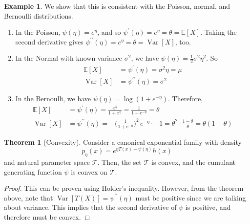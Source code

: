 \documentclass{article}
\DeclareMathOperator{\Var}{Var}
\theoremstyle{definition}
\newtheorem{theorem}{Theorem}[section]
\newtheorem{example}{Example}[section]
\begin{document}
  \begin{example}
  We show that this is consistent with the Poisson, normal, and Bernoulli distributions. 
  \begin{enumerate}
      \item In the Poisson, $\psi(\eta) = e^{\eta}$, and so $\psi^\prime(\eta) = e^\eta = \theta = \mathbb{E}[X]$. Taking the second derivative gives $\psi^{\prime\prime}(\eta) = e^\eta = \theta = \Var[X]$, too. \
      
      \item In the Normal with known variance $\sigma^2$, we have $\psi(\eta) = \frac{1}{2} \sigma^2 \eta^2$. So 
      \begin{align*}
          \mathbb{E}[X] & = \psi^\prime (\eta) = \sigma^2 \eta = \mu \\
          \Var[X] & = \psi^{\prime\prime} (\eta) = \sigma^2
      \end{align*}

      \item In the Bernoulli, we have $\psi(\eta) = \log(1 + e^{-\eta})$. Therefore, 
      \begin{align*}
          \mathbb{E}[X] & = \psi^\prime (\eta) = \frac{x^\eta}{1 + x^{\eta}} = \frac{1}{1 + e^{-\eta}} = \theta \\
          \Var[X] & = \psi^{\prime\prime} (\eta) = -\bigg(\frac{1}{1 + e^{-\eta}}\bigg)^2 \, e^{-\eta} \cdot -1 = \theta^2 \cdot \frac{1 - \theta}{\theta} = \theta (1 - \theta) 
      \end{align*}
  \end{enumerate}
  \end{example}

  \begin{theorem}[Convexity]
  Consider a canonical exponential family with density 
  \[p_\eta (x) = e^{\eta T(x) - \psi(\eta)} h(x)\]
  and natural parameter space $\mathcal{T}$. Then, the set $\mathcal{T}$ is convex, and the cumulant generating function $\psi$ is convex on $\mathcal{T}$. 
  \end{theorem}
  \begin{proof}
  This can be proven using Holder's inequality. However, from the theorem above, note that $\Var[T(X)] = \psi^{\prime\prime}(\eta)$ must be positive since we are talking about variance. This implies that the second derivative of $\psi$ is positive, and therefore must be convex. 
  \end{proof}
\end{document}

